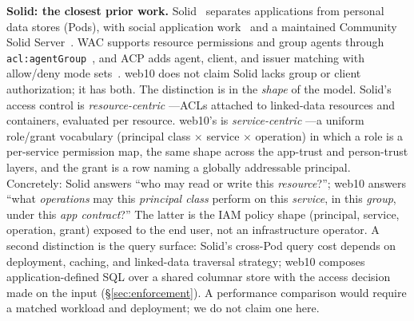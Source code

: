 \documentclass[sigconf, nonacm]{acmart}
\begin{document}
\textbf{Solid: the closest prior work.}
Solid~\cite{solid2016} separates applications from personal data stores (Pods),
with social application work~\cite{solid-apps2016} and a maintained Community
Solid Server~\cite{css2024}. WAC supports resource permissions and group agents
through \texttt{acl:agentGroup}~\cite{wac2022}, and ACP adds agent, client, and
issuer matching with allow/deny mode sets~\cite{acp2022}. web10 does not claim
Solid lacks group or client authorization; it has both. The distinction is in
the \emph{shape} of the model. Solid's access control is \emph{resource-centric}
---ACLs attached to linked-data resources and containers, evaluated per
resource. web10's is \emph{service-centric} ---a uniform role/grant vocabulary
(principal class $\times$ service $\times$ operation) in which a role is a
per-service permission map, the same shape across the app-trust and
person-trust layers, and the grant is a row naming a globally addressable
principal. Concretely: Solid answers ``who may read or write this
\emph{resource}?''; web10 answers ``what \emph{operations} may this
\emph{principal class} perform on this \emph{service}, in this \emph{group},
under this \emph{app contract}?'' The latter is the IAM policy shape
(principal, service, operation, grant) exposed to the end user, not an
infrastructure operator. A second distinction is the query surface: Solid's
cross-Pod query cost depends on deployment, caching, and linked-data traversal
strategy; web10 composes application-defined SQL over a shared columnar store
with the access decision made on the input (\S\ref{sec:enforcement}). A
performance comparison would require a matched workload and deployment; we do
not claim one here.
\end{document}
